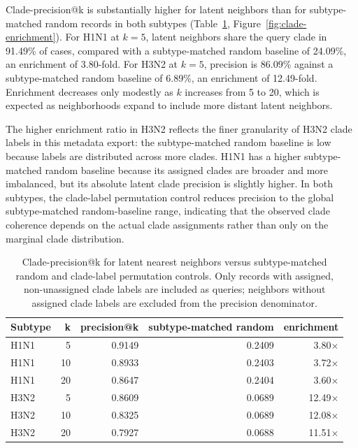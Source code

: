 \documentclass[11pt]{article}
\begin{document}
Clade-precision@k is substantially higher for latent neighbors than for subtype-matched random records in both subtypes (Table~\ref{tab:clade-enrichment}, Figure~\ref{fig:clade-enrichment}). For H1N1 at $k=5$, latent neighbors share the query clade in 91.49\% of cases, compared with a subtype-matched random baseline of 24.09\%, an enrichment of 3.80-fold. For H3N2 at $k=5$, precision is 86.09\% against a subtype-matched random baseline of 6.89\%, an enrichment of 12.49-fold. Enrichment decreases only modestly as $k$ increases from 5 to 20, which is expected as neighborhoods expand to include more distant latent neighbors.

The higher enrichment ratio in H3N2 reflects the finer granularity of H3N2 clade labels in this metadata export: the subtype-matched random baseline is low because labels are distributed across more clades. H1N1 has a higher subtype-matched random baseline because its assigned clades are broader and more imbalanced, but its absolute latent clade precision is slightly higher. In both subtypes, the clade-label permutation control reduces precision to the global subtype-matched random-baseline range, indicating that the observed clade coherence depends on the actual clade assignments rather than only on the marginal clade distribution.

\begin{table}[H]
\centering
\caption{Clade-precision@k for latent nearest neighbors versus subtype-matched random and clade-label permutation controls. Only records with assigned, non-unassigned clade labels are included as queries; neighbors without assigned clade labels are excluded from the precision denominator.}
\label{tab:clade-enrichment}
\begin{tabular}{lrrrr}
\toprule
Subtype & k & precision@k & subtype-matched random & enrichment \\
\midrule
H1N1 & 5 & 0.9149 & 0.2409 & 3.80$\times$ \\
H1N1 & 10 & 0.8933 & 0.2403 & 3.72$\times$ \\
H1N1 & 20 & 0.8647 & 0.2404 & 3.60$\times$ \\
H3N2 & 5 & 0.8609 & 0.0689 & 12.49$\times$ \\
H3N2 & 10 & 0.8325 & 0.0689 & 12.08$\times$ \\
H3N2 & 20 & 0.7927 & 0.0688 & 11.51$\times$ \\
\bottomrule
\end{tabular}
\end{table}
\end{document}
